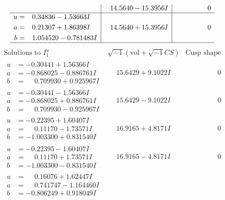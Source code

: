 \documentclass[1p]{elsarticle_modified}
\theoremstyle{definition}
\newcommand{\I}{\sqrt{-1}}
\begin{document}
$$\begin{array}{c|c|c}
 & \phantom{-}14.5640 - 15.3956 I & \phantom{-0.000000 } 0 \\ \hline\begin{aligned}
u &= \phantom{-}0.34836 - 1.53663 I \\
a &= \phantom{-}0.21307 + 1.86398 I \\
b &= \phantom{-}1.054520 - 0.781483 I\end{aligned}
 & \phantom{-}14.5640 + 15.3956 I & \phantom{-0.000000 } 0\\
 \hline 
 \end{array}$$\newpage$$\begin{array}{c|c|c}  
\text{Solutions to }I^u_{1}& \I (\text{vol} + \sqrt{-1}CS) & \text{Cusp shape}\\
 \hline 
\begin{aligned}
u &= -0.30441 + 1.56366 I \\
a &= -0.868025 - 0.886761 I \\
b &= \phantom{-}0.709930 + 0.925967 I\end{aligned}
 & \phantom{-}15.6429 + 9.1022 I & \phantom{-0.000000 } 0 \\ \hline\begin{aligned}
u &= -0.30441 - 1.56366 I \\
a &= -0.868025 + 0.886761 I \\
b &= \phantom{-}0.709930 - 0.925967 I\end{aligned}
 & \phantom{-}15.6429 - 9.1022 I & \phantom{-0.000000 } 0 \\ \hline\begin{aligned}
u &= -0.22395 + 1.60407 I \\
a &= \phantom{-}0.11170 - 1.73571 I \\
b &= -1.003300 + 0.831540 I\end{aligned}
 & \phantom{-}16.9165 + 4.8171 I & \phantom{-0.000000 } 0 \\ \hline\begin{aligned}
u &= -0.22395 - 1.60407 I \\
a &= \phantom{-}0.11170 + 1.73571 I \\
b &= -1.003300 - 0.831540 I\end{aligned}
 & \phantom{-}16.9165 - 4.8171 I & \phantom{-0.000000 } 0 \\ \hline\begin{aligned}
u &= \phantom{-}0.16076 + 1.62447 I \\
a &= \phantom{-}0.741747 - 1.164460 I \\
b &= -0.806249 + 0.918049 I\end{aligned}

\end{array}$$
\end{document}
